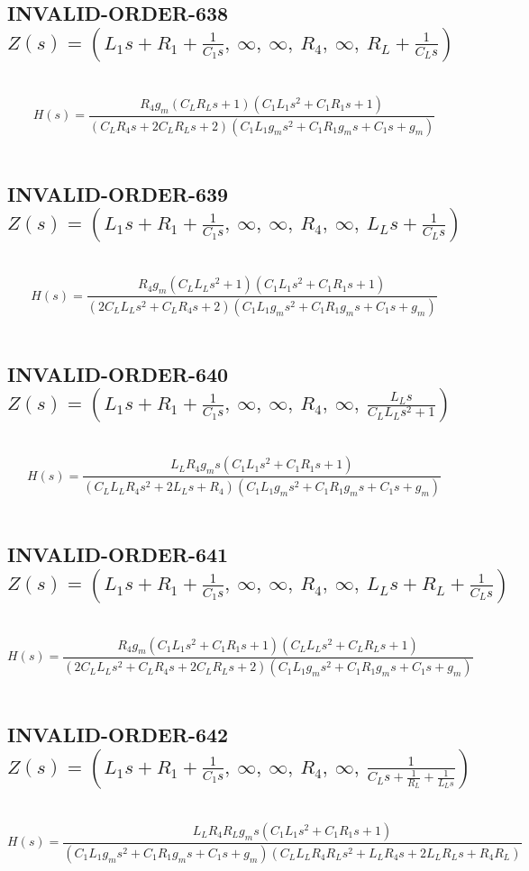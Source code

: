 \documentclass{article}
\begin{document}
\subsection{INVALID-ORDER-638 $Z(s) = \left( L_{1} s + R_{1} + \frac{1}{C_{1} s}, \  \infty, \  \infty, \  R_{4}, \  \infty, \  R_{L} + \frac{1}{C_{L} s}\right)$ } \ 
\textbf{\[H(s) = \frac{R_{4} g_{m} \left(C_{L} R_{L} s + 1\right) \left(C_{1} L_{1} s^{2} + C_{1} R_{1} s + 1\right)}{\left(C_{L} R_{4} s + 2 C_{L} R_{L} s + 2\right) \left(C_{1} L_{1} g_{m} s^{2} + C_{1} R_{1} g_{m} s + C_{1} s + g_{m}\right)}\] } \ 
\subsection{INVALID-ORDER-639 $Z(s) = \left( L_{1} s + R_{1} + \frac{1}{C_{1} s}, \  \infty, \  \infty, \  R_{4}, \  \infty, \  L_{L} s + \frac{1}{C_{L} s}\right)$ } \ 
\textbf{\[H(s) = \frac{R_{4} g_{m} \left(C_{L} L_{L} s^{2} + 1\right) \left(C_{1} L_{1} s^{2} + C_{1} R_{1} s + 1\right)}{\left(2 C_{L} L_{L} s^{2} + C_{L} R_{4} s + 2\right) \left(C_{1} L_{1} g_{m} s^{2} + C_{1} R_{1} g_{m} s + C_{1} s + g_{m}\right)}\] } \ 
\subsection{INVALID-ORDER-640 $Z(s) = \left( L_{1} s + R_{1} + \frac{1}{C_{1} s}, \  \infty, \  \infty, \  R_{4}, \  \infty, \  \frac{L_{L} s}{C_{L} L_{L} s^{2} + 1}\right)$ } \ 
\textbf{\[H(s) = \frac{L_{L} R_{4} g_{m} s \left(C_{1} L_{1} s^{2} + C_{1} R_{1} s + 1\right)}{\left(C_{L} L_{L} R_{4} s^{2} + 2 L_{L} s + R_{4}\right) \left(C_{1} L_{1} g_{m} s^{2} + C_{1} R_{1} g_{m} s + C_{1} s + g_{m}\right)}\] } \ 
\subsection{INVALID-ORDER-641 $Z(s) = \left( L_{1} s + R_{1} + \frac{1}{C_{1} s}, \  \infty, \  \infty, \  R_{4}, \  \infty, \  L_{L} s + R_{L} + \frac{1}{C_{L} s}\right)$ } \ 
\textbf{\[H(s) = \frac{R_{4} g_{m} \left(C_{1} L_{1} s^{2} + C_{1} R_{1} s + 1\right) \left(C_{L} L_{L} s^{2} + C_{L} R_{L} s + 1\right)}{\left(2 C_{L} L_{L} s^{2} + C_{L} R_{4} s + 2 C_{L} R_{L} s + 2\right) \left(C_{1} L_{1} g_{m} s^{2} + C_{1} R_{1} g_{m} s + C_{1} s + g_{m}\right)}\] } \ 
\subsection{INVALID-ORDER-642 $Z(s) = \left( L_{1} s + R_{1} + \frac{1}{C_{1} s}, \  \infty, \  \infty, \  R_{4}, \  \infty, \  \frac{1}{C_{L} s + \frac{1}{R_{L}} + \frac{1}{L_{L} s}}\right)$ } \ 
\textbf{\[H(s) = \frac{L_{L} R_{4} R_{L} g_{m} s \left(C_{1} L_{1} s^{2} + C_{1} R_{1} s + 1\right)}{\left(C_{1} L_{1} g_{m} s^{2} + C_{1} R_{1} g_{m} s + C_{1} s + g_{m}\right) \left(C_{L} L_{L} R_{4} R_{L} s^{2} + L_{L} R_{4} s + 2 L_{L} R_{L} s + R_{4} R_{L}\right)}\] } \ 
\end{document}
